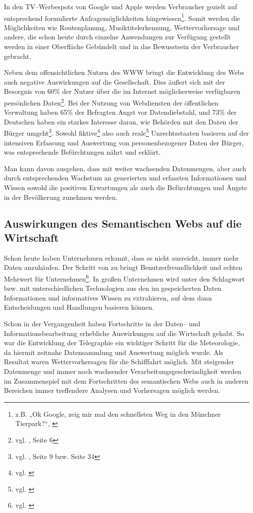 In den TV--Werbespots von Google und Apple werden Verbraucher gezielt auf entsprechend formulierte Anfragemöglichkeiten hingewiesen\footnote{z.B. „Ok Google, zeig mir mal den schnellsten Weg in den Münchner Tierpark?“, \cite{okg:tierpark}}. Somit werden die Möglichkeiten wie Routenplanung, Musiktitelerkennung, Wettervorhersage und andere, die schon heute durch einzelne Anwendungen zur Verfügung gestellt werden in einer Oberfläche Gebündelt und in das Bewusstsein der Verbraucher gebracht.

\label{probleme}
Neben dem offensichtlichen Nutzen des \ac{WWW} bringt die Entwicklung des Webs auch negative Auswirkungen auf die Gesellschaft. 
Dies äußert sich mit der Besorgnis von 60\% der Nutzer über die im Internet möglicherweise verfügbaren persönlichen Daten\footnote{vgl. \cite{d21}, Seite 6}. Bei der Nutzung von Webdiensten der öffentlichen Verwaltung haben 65\% der Befragten Angst vor Datendiebstahl, und 73\% der Deutschen haben ein starkes Interesse daran, wie Behörden mit den Daten der Bürger umgeht\footnote{vgl. \cite{d21gov}, Seite 9 bzw. Seite 34}.  Sowohl fiktive\footnote{vgl. \cite{orwell}} also auch reale\footnote{vgl. \cite{wp:stasi}} Unrechtsstaaten basieren auf der intensiven Erfassung und Auswertung von personenbezogener Daten der Bürger, was entsprechende Befürchtungen nährt und erklärt.

Man kann davon ausgehen, dass mit weiter wachsenden Datenmengen, aber auch durch entsprechenden Wachstum an generierten und erfassten Informationen und Wissen sowohl die positiven Erwartungen als auch die Befürchtungen und Ängste in der Bevölkerung zunehmen werden.

\subsection{Auswirkungen des Semantischen Webs auf die Wirtschaft}

Schon heute haben Unternehmen erkannt, dass es nicht ausreicht, immer mehr Daten anzuhäufen. Der Schritt von  zu  bringt Benutzerfreundlichkeit und echten Mehrwert für Unternehmen\footnote{vgl. \cite{odnsbi}}. In großen Unternehmen wird unter den Schlagwort  bzw.  mit unterschiedlichen Technologien aus den im  gespeicherten Daten Informationen und informatives Wissen zu extrahieren, auf dem dann Entscheidungen und Handlungen basieren können. 

Schon in der Vergangenheit haben Fortschritte in der Daten-- und Informationsbearbeitung erhebliche Auswirkungen auf die Wirtschaft gehabt. So war die Entwicklung der Telegraphie ein wichtiger Schritt für die Meteorologie, da hiermit zeitnahe Datensammlung und Auswertung möglich wurde. Als Resultat waren Wettervorhersagen für die Schiff{}fahrt möglich. Mit steigender Datenmenge und immer noch wachsender Verarbeitungsgeschwindigkeit werden im Zusammenspiel mit dem Fortschritten des semantischen Webs auch in anderen Bereichen immer treffendere Analysen und Vorhersagen möglich werden. 

